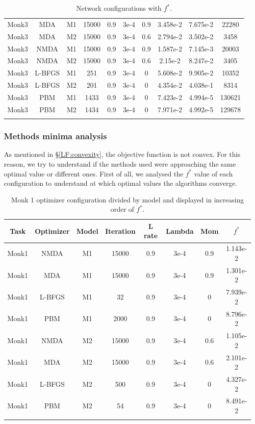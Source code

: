 \begin{center}
\begin{longtable}{|c|c|c|c|c|c|c|c|c|c|}
			Monk3 & MDA & M1 & 15000 & 0.9 & 3e-4  & 0.9 & 3.458e-2 & 7.675e-2 & 22280 \\
			Monk3 & MDA & M2 & 15000 & 0.9 & 3e-4  & 0.6 & 2.794e-2 & 3.502e-2 & 3458 \\
			Monk3 & NMDA & M1 & 15000 & 0.9 & 3e-4  & 0.9 & 1.587e-2 & 7.145e-3 & 20003 \\
			Monk3 & NMDA & M2 & 15000 & 0.9 & 3e-4  & 0.6 & 2.15e-2 & 8.247e-2 & 3405 \\
			Monk3 & L-BFGS & M1 & 251 & 0.9 & 3e-4  & 0 & 5.608e-2 & 9.905e-2 & 10352 \\
			Monk3 & L-BFGS & M2 & 201 & 0.9 & 3e-4  & 0 & 4.354e-2 & 4.038e-1 & 8314 \\
			Monk3 & PBM & M1 & 1433 & 0.9 & 3e-4  & 0 & 7.423e-2 & 4.994e-5 & 130621 \\
			Monk3 & PBM & M2 & 1434 & 0.9 & 3e-4  & 0 & 7.971e-2 & 4.992e-5 & 129678  \\
			\hline
			\caption{Network configurations with $f^*$.}
			\label{tab:nets_res}
		\end{longtable}

\end{center}

\subsubsection{Methods minima analysis} 

As mentioned in \S\ref{LF:convexity}, the objective function is not convex. For this reason, we try to understand if the methods used were approaching the same optimal value or different ones.
First of all, we analysed the $f^{*}$ value of each configuration to understand at which optimal values the algorithms converge. 

\begin{longtable}{|c|c|c|c|c|c|c|c|}
	\hline
	\centering
	\textbf{Task}&\textbf{Optimizer}&\textbf{Model} &\textbf{Iteration} & \textbf{L rate} & \multicolumn{1}{l|}{\textbf{Lambda}} & \textbf{Mom} & \textbf{$f^{*}$} \\ \hline 
	Monk1 & NMDA & M1 & 15000 & 0.9 & 3e-4  & 0.9 & 1.143e-2 	\\
	Monk1 & MDA & M1 & 15000 & 0.9 & 3e-4  & 0.9 & 1.301e-2  		\\
	Monk1 & L-BFGS & M1 & 32 & 0.9 & 3e-4  & 0 &  7.939e-2 			\\
	Monk1 & PBM & M1 & 2000 & 0.9 & 3e-4  & 0 & 8.796e-2  			\\
	Monk1 & NMDA & M2 & 15000 & 0.9 & 3e-4  & 0.6 & 1.105e-2 	\\
	Monk1 & MDA & M2 & 15000 & 0.9 & 3e-4  & 0.6 & 2.101e-2 		\\
	Monk1 & L-BFGS & M2 & 500 & 0.9 & 3e-4  & 0 &   4.327e-2 		\\
	Monk1 & PBM & M2 & 54 & 0.9 & 3e-4  & 0 & 8.491e-2 				\\
	\hline
	\caption{Monk 1 optimizer configuration divided by model and displayed in increasing order of $f^*$.}
	\label{tab:nets_res_plots_Monk1}
\end{longtable}

